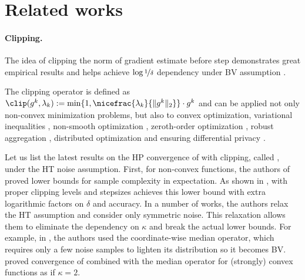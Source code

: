 \section{Related works}
\paragraph{Clipping.} The idea of clipping the norm of gradient estimate before  step demonstrates great empirical results \cite{pascanu2013difficulty, goodfellow2016deep} and helps achieve $\log \nicefrac{1}{\delta}$ dependency under BV assumption \cite{nazin2019algorithms, gorbunov2020stochastic}. 

The clipping operator is defined as $\clip(g^k, \lambda_k) := \min\{1, \nicefrac{\lambda_k}{\|g^k\|_2}\} \cdot g^k$ and can be applied not only 
non-convex minimization problems, but also to convex optimization, variational inequalities \cite{sadiev2023high}, non-smooth optimization \cite{zhang2020adaptivegood}, zeroth-order optimization \cite{kornilov2024accelerated}, robust aggregation \cite{karimireddy2021learning}, distributed optimization \cite{liu2022communication, qin2025high} and ensuring differential privacy \cite{andrew2021differentially}. %

Let us list the latest results on the HP convergence of  with clipping, called , under the HT noise assumption. First, for non-convex functions, the authors of \cite{zhang2020adaptivegood} proved lower bounds for sample complexity in expectation. As shown in \cite{sadiev2023high},  with proper clipping levels and stepsizes achieves this lower bound with extra logarithmic factors on $\delta$ and accuracy. In a number of works, the authors relax the HT assumption and consider only symmetric noise. This relaxation allows them to eliminate the dependency on $\kappa$ and break the actual lower bounds. For example, in \cite{puchkin2024breaking},  the authors used the coordinate-wise median operator, which requires only a few noise samples to lighten its distribution so it becomes BV. \cite{puchkin2024breaking} proved convergence of  combined with the median operator for (strongly) convex functions as if $\kappa = 2$. %

